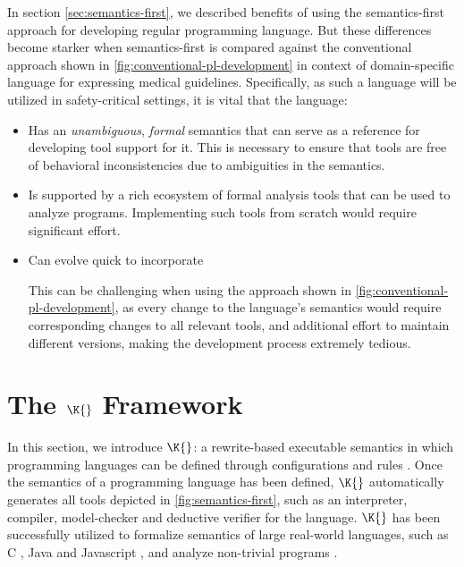 In section \ref{sec:semantics-first}, we described benefits
of using the semantics-first approach for developing regular programming
language. But these differences become starker when semantics-first
is compared against the conventional approach shown in \autoref{fig:conventional-pl-development} in context of domain-specific language for
expressing medical guidelines. Specifically, as such a language will be utilized
in safety-critical settings, it is vital that the language:
\begin{itemize}
  \item Has an \emph{unambiguous}, \emph{formal}
    semantics that can serve as a reference for developing tool support for it.
    This is necessary to ensure that
    tools are free of behavioral inconsistencies due to ambiguities in the
    semantics.
  \item Is supported by a rich ecosystem of formal analysis tools that can
    be used to analyze programs.
    Implementing such tools from scratch would require significant effort.
  \item Can evolve quick to incorporate
    This can be challenging when using the approach shown in \autoref{fig:conventional-pl-development}, as
    every change to the language's semantics would require corresponding
    changes to all relevant tools, and additional effort to maintain
    different versions, making the development process extremely tedious.
\end{itemize}

\section{The $\K{}$ Framework}\label{sec:k-framework}

In this section, we introduce $\K{}$: a rewrite-based executable semantics
in which programming languages can be defined through configurations and rules
\cite{KframeworkUrl}. Once the semantics of a programming language has been
defined, $\K{}$ automatically generates all tools depicted in \autoref{fig:semantics-first}, such as an interpreter, compiler,
model-checker and deductive verifier for the language. $\K{}$ has been successfully
utilized to formalize semantics of large real-world languages, such as
C \cite{HathhornPLDI15}, Java \cite{BogdanasPOPL15} and
Javascript \cite{ParkPLDI15}, and analyze non-trivial programs
\cite{StefanescuOOPSLA16,ParkFSE18}.

